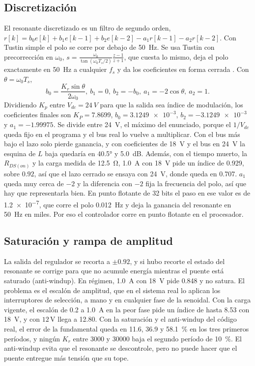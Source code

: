 \documentclass[journal]{IEEEtran}
\begin{document}
\subsection{Discretización}
\label{sec:disc}
El resonante discretizado es un filtro de segundo orden, $r[k]=b_0e[k]+b_1e[k-1]+b_2e[k-2]-a_1r[k-1]-a_2r[k-2]$. Con Tustin simple el polo se corre por debajo de \SI{50}{Hz}. Se usa Tustin con precorrección en $\omega_0$, $s=\frac{\omega_0}{\tan(\omega_0T_s/2)}\frac{z-1}{z+1}$, que cuesta lo mismo, deja el polo exactamente en \SI{50}{Hz} a cualquier $f_s$ y da los coeficientes en forma cerrada \cite{yepes2010}. Con $\theta=\omega_0T_s$,
\begin{equation}
	b_0=\frac{K_r\sin\theta}{2\omega_0},\ b_1=0,\ b_2=-b_0,\ a_1=-2\cos\theta,\ a_2=1.
	\label{eq:coef}
\end{equation}
Dividiendo $K_p$ entre $V_{dc}=\SI{24}{V}$ para que la salida sea índice de modulación, los coeficientes finales son $K_P=\num{7.8699}$, $b_0=\num{3.1249e-3}$, $b_2=-\num{3.1249e-3}$ y $a_1=-\num{1.99975}$. Se divide entre \SI{24}{V}, el máximo del enunciado, porque el $1/V_{dc}$ queda fijo en el programa y el bus real lo vuelve a multiplicar. Con el bus más bajo el lazo solo pierde ganancia, y con coeficientes de \SI{18}{V} y el bus en \SI{24}{V} la esquina de $L$ baja quedaría en \ang{40.5} y \SI{5.0}{dB}. Además, con el tiempo muerto, la $R_{DS(on)}$ y la carga medida de \SI{12.5}{\ohm}, \SI{1.0}{A} con \SI{18}{V} pide un índice de \num{0.929}, sobre $\num{0.92}$, así que el lazo cerrado se ensaya con \SI{24}{V}, donde queda en \num{0.707}. $a_1$ queda muy cerca de $-2$ y la diferencia con $-2$ fija la frecuencia del polo, así que hay que representarla bien. En punto flotante de \num{32} bits el paso en ese valor es de \num{1.2e-7}, que corre el polo \SI{0.012}{Hz} y deja la ganancia del resonante en \SI{50}{Hz} en miles. Por eso el controlador corre en punto flotante en el procesador.

\subsection{Saturación y rampa de amplitud}
\label{sec:sat}
La salida del regulador se recorta a $\pm0.92$, y si hubo recorte el estado del resonante se corrige para que no acumule energía mientras el puente está saturado (anti-windup). En régimen, \SI{1.0}{A} con \SI{18}{V} pide \num{0.848} y no satura. El problema es el escalón de amplitud, que en el sistema real lo aplican los interruptores de selección, a mano y en cualquier fase de la senoidal. Con la carga vigente, el escalón de \num{0.2} a \SI{1.0}{A} en la peor fase pide un índice de hasta \num{8.53} con \SI{18}{V}, y con $12\,\mathrm{V}$ llega a \num{12.80}. Con la saturación y el anti-windup del código real, el error de la fundamental queda en \num{11.6}, \num{36.9} y \SI{58.1}{\percent} en los tres primeros períodos, y ningún $K_r$ entre \num{3000} y \num{30000} baja el segundo período de \SI{10}{\percent}. El anti-windup evita que el resonante se descontrole, pero no puede hacer que el puente entregue más tensión que su tope.
\end{document}
